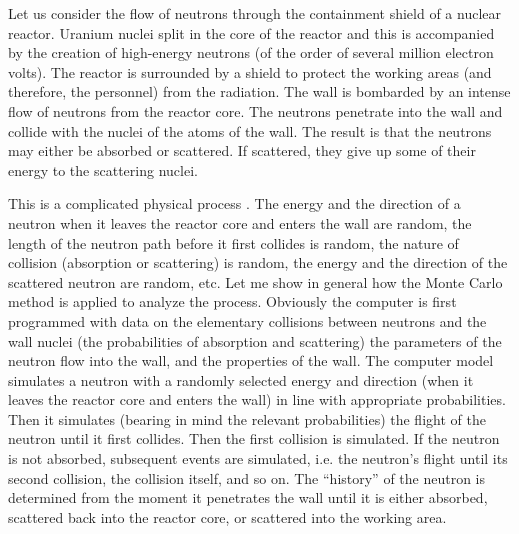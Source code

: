  Let us consider the
flow of neutrons through the containment shield of a nuclear reactor.
Uranium nuclei split in the core of the reactor and this is accompanied
by the creation of high-energy neutrons (of the order of several million
electron volts). The reactor is surrounded by a shield to protect the
working areas (and therefore, the personnel) from the radiation. The
wall is bombarded by an intense flow of neutrons from the reactor core.
The neutrons penetrate into the wall and collide with the nuclei of the
atoms of the wall. The result is that the neutrons may either be
absorbed or scattered. If scattered, they give up some of their energy to
the scattering nuclei.

This is a complicated physical process .
The energy and the direction of a neutron when it leaves the reactor
core and enters the wall are random, the length of the neutron path
before it first collides is random, the nature of collision (absorption or
scattering) is random, the energy and the direction of the scattered
neutron are random, etc. Let me show in general how the Monte Carlo
method is applied to analyze the process. Obviously the computer is
first programmed with data on the elementary collisions between
neutrons and the wall nuclei (the probabilities of absorption and
scattering) the parameters of the neutron flow into the wall, and the
properties of the wall. The computer model simulates a neutron with
a randomly selected energy and direction (when it leaves the reactor
core and enters the wall) in line with appropriate probabilities. Then it
simulates (bearing in mind the relevant probabilities) the flight of the
neutron until it first collides. Then the first collision is simulated. If the
neutron is not absorbed, subsequent events are simulated, i.e. the
neutron's flight until its second collision, the collision itself, and so on.
The ``history'' of the neutron is determined from the moment it
penetrates the wall until it is either absorbed, scattered back into the
reactor core, or scattered into the working area. 


